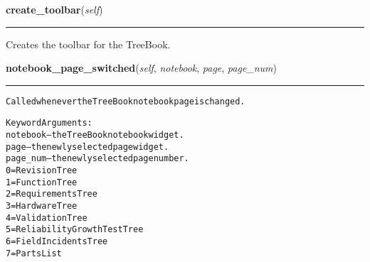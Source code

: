     \vspace{0.5ex}

\hspace{.8\funcindent}\begin{boxedminipage}{\funcwidth}

    \raggedright \textbf{create\_toolbar}(\textit{self})

    \vspace{-1.5ex}

    \rule{\textwidth}{0.5\fboxrule}
\setlength{\parskip}{2ex}
    Creates the toolbar for the TreeBook.

\setlength{\parskip}{1ex}
    \end{boxedminipage}

    \label{reliafree:tree:TreeWindow:notebook_page_switched}

    \vspace{0.5ex}

\hspace{.8\funcindent}\begin{boxedminipage}{\funcwidth}

    \raggedright \textbf{notebook\_page\_switched}(\textit{self}, \textit{notebook}, \textit{page}, \textit{page\_num})

    \vspace{-1.5ex}

    \rule{\textwidth}{0.5\fboxrule}
\setlength{\parskip}{2ex}
\begin{alltt}
Called whenever the Tree Book notebook page is changed.

Keyword Arguments:
notebook -- the Tree Book notebook widget.
page     -- the newly selected page widget.
page\_num -- the newly selected page number.
            0 = Revision Tree
            1 = Function Tree
            2 = Requirements Tree
            3 = Hardware Tree
            4 = Validation Tree
            5 = Reliability Growth Test Tree
            6 = Field Incidents Tree
            7 = Parts List
\end{alltt}

\setlength{\parskip}{1ex}
    \end{boxedminipage}

    \label{reliafree:tree:TreeWindow:delete_event}

